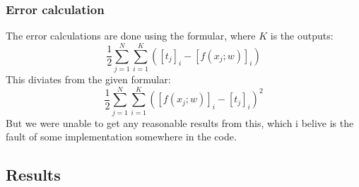 \documentclass{article}
\begin{document}
\subsubsection{Error calculation}
The error calculations are done using the formular, where $K$ is the outputs:
\begin{equation}
    \frac{1}{2} \sum_{j = 1}^{N}\sum_{i = 1}^{K}([t_j]_i - [f(x_j;w)]_i)
\end{equation}
This diviates from the given formular:
\begin{equation}
    \frac{1}{2} \sum_{j = 1}^{N} \sum_{i = 1}^{K}([f(x_j;w)]_i - [t_j]_i)^2
\end{equation}
But we were unable to get any reasonable results from this, which i belive is the fault of some implementation somewhere in the code.\\


\subsection{Results}
\end{document}

